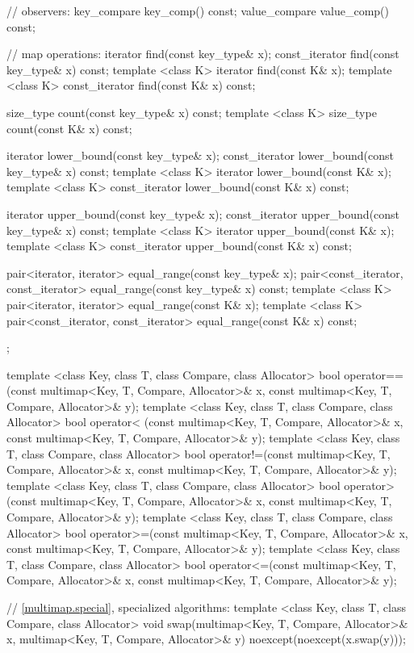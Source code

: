 \begin{codeblock}
{{    // observers:
    key_compare key_comp() const;
    value_compare value_comp() const;

    // map operations:
    iterator       find(const key_type& x);
    const_iterator find(const key_type& x) const;
    template <class K> iterator       find(const K& x);
    template <class K> const_iterator find(const K& x) const;

    size_type      count(const key_type& x) const;
    template <class K> size_type count(const K& x) const;

    iterator       lower_bound(const key_type& x);
    const_iterator lower_bound(const key_type& x) const;
    template <class K> iterator       lower_bound(const K& x);
    template <class K> const_iterator lower_bound(const K& x) const;

    iterator       upper_bound(const key_type& x);
    const_iterator upper_bound(const key_type& x) const;
    template <class K> iterator       upper_bound(const K& x);
    template <class K> const_iterator upper_bound(const K& x) const;

    pair<iterator, iterator>               equal_range(const key_type& x);
    pair<const_iterator, const_iterator>   equal_range(const key_type& x) const;
    template <class K>
      pair<iterator, iterator>             equal_range(const K& x);
    template <class K>
      pair<const_iterator, const_iterator> equal_range(const K& x) const;
  };

  template <class Key, class T, class Compare, class Allocator>
    bool operator==(const multimap<Key, T, Compare, Allocator>& x,
                    const multimap<Key, T, Compare, Allocator>& y);
  template <class Key, class T, class Compare, class Allocator>
    bool operator< (const multimap<Key, T, Compare, Allocator>& x,
                    const multimap<Key, T, Compare, Allocator>& y);
  template <class Key, class T, class Compare, class Allocator>
    bool operator!=(const multimap<Key, T, Compare, Allocator>& x,
                    const multimap<Key, T, Compare, Allocator>& y);
  template <class Key, class T, class Compare, class Allocator>
    bool operator> (const multimap<Key, T, Compare, Allocator>& x,
                    const multimap<Key, T, Compare, Allocator>& y);
  template <class Key, class T, class Compare, class Allocator>
    bool operator>=(const multimap<Key, T, Compare, Allocator>& x,
                    const multimap<Key, T, Compare, Allocator>& y);
  template <class Key, class T, class Compare, class Allocator>
    bool operator<=(const multimap<Key, T, Compare, Allocator>& x,
                    const multimap<Key, T, Compare, Allocator>& y);

  // \ref{multimap.special}, specialized algorithms:
  template <class Key, class T, class Compare, class Allocator>
    void swap(multimap<Key, T, Compare, Allocator>& x,
              multimap<Key, T, Compare, Allocator>& y)
      noexcept(noexcept(x.swap(y)));
}
\end{codeblock}%
%

